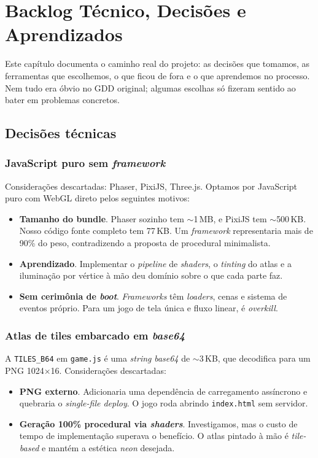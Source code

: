 \chapter{Backlog Técnico, Decisões e Aprendizados}

Este capítulo documenta o caminho real do projeto: as decisões que tomamos, as
ferramentas que escolhemos, o que ficou de fora e o que aprendemos no processo. Nem
tudo era óbvio no GDD original; algumas escolhas só fizeram sentido ao bater em
problemas concretos.

\section{Decisões técnicas}

\subsection{JavaScript puro sem \emph{framework}}

Considerações descartadas: Phaser, PixiJS, Three.js. Optamos por JavaScript puro com
WebGL direto pelos seguintes motivos:

\begin{itemize}
  \item \textbf{Tamanho do bundle}. Phaser sozinho tem $\sim$1\,MB, e PixiJS tem
    $\sim$500\,KB. Nosso código fonte completo tem 77\,KB. Um \emph{framework}
    representaria mais de 90\% do peso, contradizendo a proposta de procedural
    minimalista.
  \item \textbf{Aprendizado}. Implementar o \emph{pipeline} de \emph{shaders}, o
    \emph{tinting} do atlas e a iluminação por vértice à mão deu domínio sobre o que
    cada parte faz.
  \item \textbf{Sem cerimônia de \emph{boot}}. \emph{Frameworks} têm \emph{loaders},
    cenas e sistema de eventos próprio. Para um jogo de tela única e fluxo linear, é
    \emph{overkill}.
\end{itemize}

\subsection{Atlas de tiles embarcado em \emph{base64}}

A \texttt{TILES\_B64} em \texttt{game.js} é uma \emph{string} \emph{base64} de
$\sim$3\,KB, que decodifica para um PNG 1024$\times$16. Considerações descartadas:

\begin{itemize}
  \item \textbf{PNG externo}. Adicionaria uma dependência de carregamento assíncrono
    e quebraria o \emph{single-file deploy}. O jogo roda abrindo \texttt{index.html}
    sem servidor.
  \item \textbf{Geração 100\% procedural via \emph{shaders}}. Investigamos, mas o
    custo de tempo de implementação superava o benefício. O atlas pintado à mão é
    \emph{tile-based} e mantém a estética \emph{neon} desejada.
\end{itemize}

